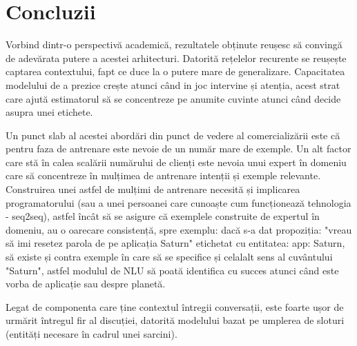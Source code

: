 \chapter{Concluzii}

Vorbind dintr-o perspectivă academică, rezultatele obținute reușesc să convingă de adevărata putere a acestei arhitecturi.
Datorită rețelelor recurente se reușește captarea contextului, fapt ce duce la o putere mare de generalizare. Capacitatea modelului de a prezice crește atunci când in joc intervine și atenția, acest strat care ajută estimatorul să se concentreze pe anumite cuvinte atunci când decide asupra unei etichete.

Un punct slab al acestei abordări din punct de vedere al comercializării este că pentru faza de antrenare este nevoie de un număr mare de exemple. Un alt factor care stă în calea scalării numărului de clienți este nevoia unui expert în domeniu care să concentreze în mulțimea de antrenare intenții și exemple relevante. Construirea unei astfel de mulțimi de antrenare necesită și implicarea programatorului (sau a unei persoanei care cunoaște cum funcționează tehnologia - seq2seq), astfel încât să se asigure că exemplele construite de expertul în domeniu, au o oarecare consistență, spre exemplu: dacă s-a dat propoziția: "vreau să imi resetez parola de pe aplicația Saturn" etichetat cu entitatea: app: Saturn, să existe și contra exemple în care să se specifice și celalalt sens al cuvântului "Saturn", astfel modulul de NLU să poată identifica cu succes atunci când este vorba de aplicație sau despre planetă.

Legat de componenta care ține contextul întregii conversații, este foarte ușor de urmărit întregul fir al discuției, datorită modelului bazat pe umplerea de sloturi (entități necesare în cadrul unei sarcini).